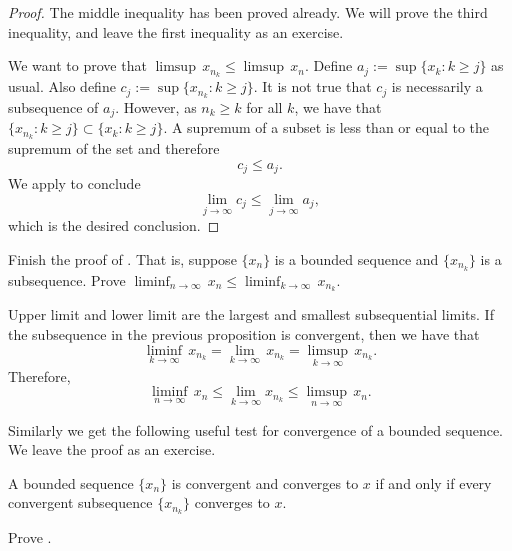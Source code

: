 \documentclass[12pt]{book}
\begin{document}
\begin{proof}
The middle inequality has been proved already.
We will prove the third
inequality, and leave the first inequality as an exercise.

We want to prove that
$\limsup \, x_{n_k} \leq \limsup \, x_n$.
Define
$a_j := \sup \{ x_k : k \geq j \}$ 
as usual.
Also define
$c_j := \sup \{ x_{n_k} : k \geq j \}$.
It is not true that $c_j$ is necessarily a subsequence of $a_j$.  However,
as $n_k \geq k$ for all $k$, we have that
$\{ x_{n_k} : k \geq j \} \subset \{ x_k : k \geq j \}$.
A supremum of a subset is less than or equal to the supremum of the
set and therefore
\begin{equation*}
c_j \leq a_j .
\end{equation*}
We apply  to conclude 
\begin{equation*}
\lim_{j\to\infty} c_j \leq \lim_{j\to\infty} a_j ,
\end{equation*}
which is the desired conclusion.
\end{proof}

\begin{exercise}
Finish the proof of .
That is,
suppose $\{ x_n \}$ is a bounded sequence and
$\{ x_{n_k} \}$ is a subsequence.
Prove
$\displaystyle \liminf_{n\to\infty}\, x_n \leq
\liminf_{k\to\infty}\, x_{n_k}$.
\end{exercise}

Upper limit and lower limit are the largest and smallest subsequential limits.
If the subsequence in the previous proposition is convergent, then we have that
\[\liminf_{k\to\infty} \, x_{n_k} = \lim_{k\to\infty}\, x_{n_k} = \limsup_{k\to\infty} \, x_{n_k}.\]  
Therefore,
\begin{equation*}
\liminf_{n\to\infty} \, x_n \leq
\lim_{k\to\infty} x_{n_k} \leq
\limsup_{n\to\infty} \, x_n .
\end{equation*}

Similarly we get the following useful test for convergence
of a bounded sequence.
We leave the proof as an exercise.

\begin{thm} \label{seqconvsubseqconv:thm}
A bounded sequence $\{ x_n \}$ is convergent and converges to $x$
if and only if
every convergent subsequence
$\{ x_{n_k} \}$ converges to $x$.
\end{thm}

\begin{exercise}
Prove .
\end{exercise}
\end{document}
